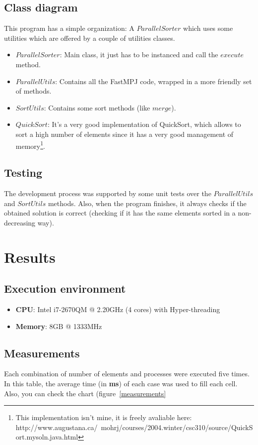 \documentclass[a4paper,10pt]{article}
\begin{document}
  \subsection{Class diagram}
  This program has a simple organization: A $ParallelSorter$ which uses some utilities which are offered by a couple of utilities classes.
  \begin{itemize}
   \item $ParallelSorter$: Main class, it just has to be instanced and call the $execute$ method.
   \item $ParallelUtils$: Contains all the FastMPJ code, wrapped in a more friendly set of methods.
   \item $SortUtils$: Contains some sort methods (like $merge$).
   \item $QuickSort$: It's a very good implementation of QuickSort, which allows to sort a high number of elements since it has a very good management of memory\footnote{This implementation isn't mine, it is freely avaliable here: http://www.augustana.ca/~mohrj/courses/2004.winter/csc310/source/QuickSort.mysoln.java.html}.
  \end{itemize}
  
  \subsection{Testing}
  The development process was supported by some unit tests over the $ParallelUtils$ and $SortUtils$ methods. Also, when the program finishes, 
  it always checks if the obtained solution is correct (checking if it has the same elements sorted in a non-decreasing way).

\section{Results}

  \subsection{Execution environment}
  \begin{itemize}
   \item {\bf CPU}: Intel i7-2670QM @ 2.20GHz (4 cores) with Hyper-threading
   \item {\bf Memory}: 8GB @ 1333MHz
  \end{itemize}

  \subsection{Measurements}
  Each combination of number of elements and processes were executed five times. In this table, the average time (in {\bf ms}) of each case was used to fill each cell. Also, you can 
  check the chart (figure~\ref{measurements}
  
\end{document}
